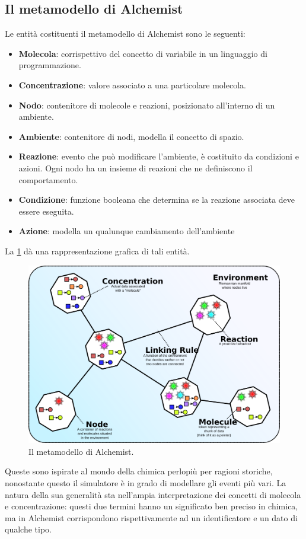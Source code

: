 \documentclass[12pt,a4paper,openright,oneside]{book}
\begin{document}
\subsection{Il metamodello di Alchemist}
Le entità costituenti il metamodello di Alchemist sono le seguenti:
\begin{itemize}
 \item \textbf{Molecola}: corrispettivo del concetto di variabile in un linguaggio di programmazione.
 \item \textbf{Concentrazione}: valore associato a una particolare molecola.
 \item \textbf{Nodo}: contenitore di molecole e reazioni, posizionato all’interno di un ambiente.
 \item \textbf{Ambiente}: contenitore di nodi, modella il concetto di spazio.
 \item \textbf{Reazione}: evento che può modificare l’ambiente, è costituito da condizioni e azioni. Ogni nodo ha un insieme di reazioni che ne definiscono il comportamento.
 \item \textbf{Condizione}: funzione booleana che determina se la reazione associata deve essere eseguita.
 \item \textbf{Azione}: modella un qualunque cambiamento dell’ambiente 
\end{itemize}
La \cref{fig:alchemist-meta-model} dà una rappresentazione grafica di tali entità. 
\begin{figure}
	\centering
	\includegraphics[width=0.8\linewidth]{figures/alchemist-meta-model.png}
	\caption{Il metamodello di Alchemist.}
	\label{fig:alchemist-meta-model}
\end{figure}
Queste sono ispirate al mondo della chimica perlopiù per ragioni storiche, nonostante questo il simulatore è in grado di modellare gli eventi più vari. La natura della sua generalità sta nell’ampia interpretazione dei concetti di molecola e concentrazione: questi due termini hanno un significato ben preciso in chimica, ma in Alchemist corrispondono rispettivamente ad un identificatore e un dato di qualche tipo.
\end{document}
